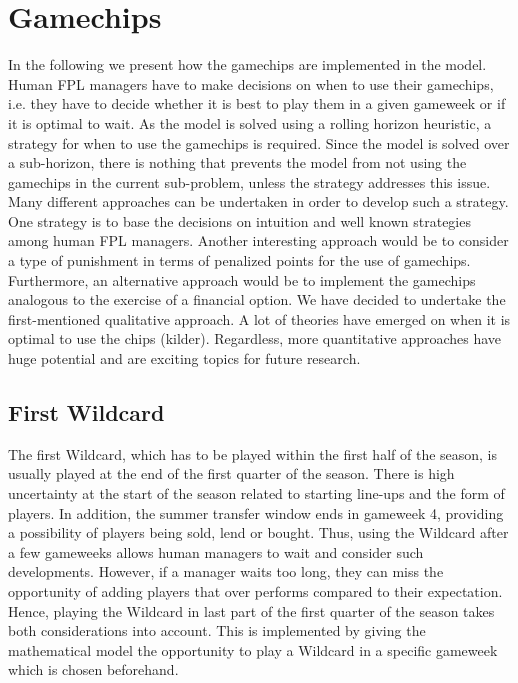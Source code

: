 \newpage
\section{Gamechips}\label{Ch.5_Game_chips}
In the following we present how the gamechips are implemented in the model. Human FPL managers have to make decisions on when to use their gamechips, i.e. they have to decide whether it is best to play them in a given gameweek or if it is optimal to wait. As the model is solved using a rolling horizon heuristic, a strategy for when to use the gamechips is required. Since the model is solved over a sub-horizon, there is nothing that prevents the model from not using the gamechips in the current sub-problem, unless the strategy addresses this issue. Many different approaches can be undertaken in order to develop such a strategy. One strategy is to base the decisions on intuition and well known strategies among human FPL managers. Another interesting approach would be to consider a type of punishment in terms of penalized points for the use of gamechips. Furthermore, an alternative approach would be to implement the gamechips analogous to the exercise of a financial option. We have decided to undertake the first-mentioned qualitative approach. A lot of theories have emerged on when it is optimal to use the chips (kilder). Regardless, more quantitative approaches have huge potential and are exciting topics for future research.

\subsection{First Wildcard}
The first Wildcard, which has to be played within the first half of the season, is usually played at the end of the first quarter of the season. There is high uncertainty at the start of the season related to starting line-ups and the form of players. In addition, the summer transfer window ends in gameweek 4, providing a possibility of players being sold, lend or bought. Thus, using the Wildcard after a few gameweeks allows human managers to wait and consider such developments. However, if a manager waits too long, they can miss the opportunity of adding players that over performs compared to their expectation. Hence, playing the Wildcard in last part of the first quarter of the season takes both considerations into account. This is implemented by giving the mathematical model the opportunity to play a Wildcard in a specific gameweek which is chosen beforehand.


